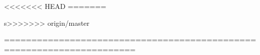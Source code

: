 \documentclass[11pt]{article}
\begin{document}
<<<<<<< HEAD
=======



s>>>>>>> origin/master

 ======================================================================
\end{document}
